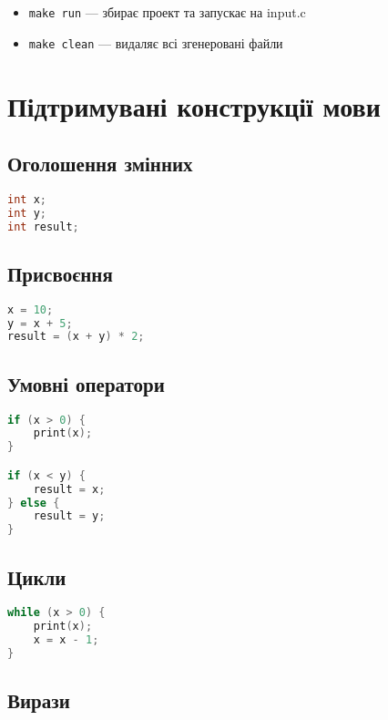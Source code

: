 \documentclass[12pt,a4paper]{article}
\begin{document}
\begin{itemize}
    \item \texttt{make run} --- збирає проект та запускає на input.c
    \item \texttt{make clean} --- видаляє всі згенеровані файли
\end{itemize}

\section{Підтримувані конструкції мови}

\subsection{Оголошення змінних}

\begin{lstlisting}[language=C]
int x;
int y;
int result;
\end{lstlisting}

\subsection{Присвоєння}

\begin{lstlisting}[language=C]
x = 10;
y = x + 5;
result = (x + y) * 2;
\end{lstlisting}

\subsection{Умовні оператори}

\begin{lstlisting}[language=C]
if (x > 0) {
    print(x);
}

if (x < y) {
    result = x;
} else {
    result = y;
}
\end{lstlisting}

\subsection{Цикли}

\begin{lstlisting}[language=C]
while (x > 0) {
    print(x);
    x = x - 1;
}
\end{lstlisting}

\subsection{Вирази}
\end{document}
